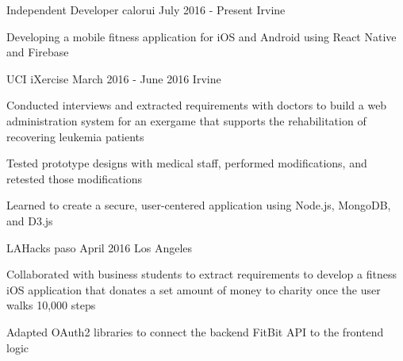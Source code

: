 

\begin{cventries}

  \cventry
    {Independent Developer} %
    {calorui}
    {July 2016 - Present} %
    {Irvine} %
    {
      \begin{cvitems} %
        \item Developing a mobile fitness application for iOS and Android using React Native and Firebase
      \end{cvitems}
    }

  \cventry
    {UCI}
    {iXercise} %
    {March 2016 - June 2016} 
    {Irvine} 
    {
      \begin{cvitems} %
        \item Conducted interviews and extracted requirements with doctors to build a web administration system for an exergame that supports the rehabilitation of recovering leukemia patients
        \item Tested prototype designs with medical staff, performed modifications, and retested those modifications
        \item Learned to create a secure, user-centered application using Node.js, MongoDB, and D3.js
      \end{cvitems}
    }

  \cventry
  {LAHacks}
  {paso} %
  {April 2016} 
  {Los Angeles} 
  {
  	\begin{cvitems} %
  		\item Collaborated with business students to extract requirements to develop a fitness iOS application that donates a set amount of money to charity once the user walks 10,000 steps
  		\item Adapted OAuth2 libraries to connect the backend FitBit API to the frontend logic
  	\end{cvitems}
  }
  
\end{cventries}
